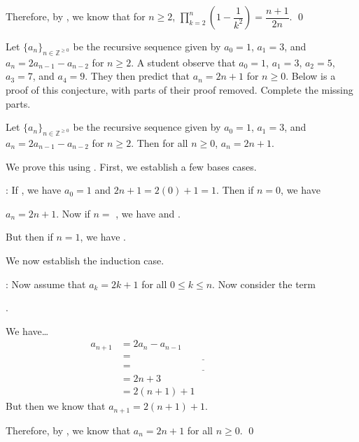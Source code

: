 \documentclass[11pt,letterpaper]{article}
\begin{document}
Therefore, by \underline{\hspace{6cm}}, we know that for $n \geq 2$, $\displaystyle\prod_{k=2}^n \left(1 - \dfrac{1}{k^2} \right)= \dfrac{n + 1}{2n}$. \qed



\newpage



 Let $\{ a_n \}_{n \in \mathbb{Z}^{\geq 0}}$ be the recursive sequence given by $a_0= 1$, $a_1= 3$, and $a_n= 2a_{n - 1}  - a_{n - 2}$ for $n \geq 2$. A student observe that $a_0= 1$, $a_1= 3$, $a_2= 5$, $a_3= 7$, and $a_4= 9$. They then predict that $a_n= 2n + 1$ for $n \geq 0$. Below is a proof of this conjecture, with parts of their proof removed. Complete the missing parts. \pspace

 Let $\{ a_n \}_{n \in \mathbb{Z}^{\geq 0}}$ be the recursive sequence given by $a_0= 1$, $a_1= 3$, and $a_n= 2a_{n - 1}  - a_{n - 2}$ for $n \geq 2$. Then for all $n \geq 0$, $a_n= 2n + 1$. \pspace

 We prove this using \underline{\hspace{6cm}}. First, we establish a few bases cases. \pspace

: If \underline{\hspace{3cm}}, we have $a_0= 1$ and $2n + 1= 2(0) + 1= 1$. Then if $n= 0$, we have \pspace

$a_n= 2n + 1$. Now if $n=$ \underline{\hspace{3cm}}, we have \underline{\hspace{4cm}} and \underline{\hspace{4cm}}. \pspace

But then if $n= 1$, we have \underline{\hspace{3cm}}. \pspace

We now establish the induction case. \pspace

: Now assume that $a_k= 2k + 1$ for all $0 \leq k \leq n$. Now consider the term \pspace

\underline{\hspace{3cm}}. \pspace

We have\dots
	\[
	\begin{aligned}
	a_{n + 1}&= 2a_n - a_{n - 1} \\[0.3cm]
	&= \underline{\hspace{6cm}} \\[0.3cm]
	&= \underline{\hspace{6cm}} \\[0.3cm]
	&= 2n + 3 \\[0.3cm]
	&= 2(n + 1) + 1
	\end{aligned}
	\] \pspace
But then we know that $a_{n + 1}= 2(n + 1) + 1$. \pspace

Therefore, by \underline{\hspace{6cm}}, we know that $a_n= 2n + 1$ for all $n \geq 0$. \qed
\end{document}
